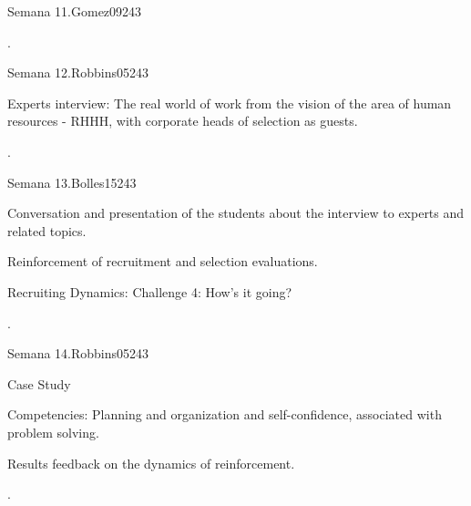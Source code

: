 \begin{syllabus}
\begin{unit}{Semana 11.}{Gomez09}{24}{3}
   \begin{unitgoals}
      \item .
   \end{unitgoals}
\end{unit}

\begin{unit}{Semana 12.}{Robbins05}{24}{3}
   \begin{topics}
      \item Experts interview: The real world of work from the vision of the area of human resources - RHHH, with corporate heads of selection as guests.
   \end{topics}

   \begin{unitgoals}
      \item .
   \end{unitgoals}
\end{unit}

\begin{unit}{Semana 13.}{Bolles15}{24}{3}
   \begin{topics}
      \item Conversation and presentation of the students about the interview to experts and related topics.
      \item Reinforcement of recruitment and selection evaluations.
      \item Recruiting Dynamics: Challenge 4: How's it going?
   \end{topics}

   \begin{unitgoals}
      \item .
   \end{unitgoals}
\end{unit}

\begin{unit}{Semana 14.}{Robbins05}{24}{3}
   \begin{topics}
      \item Case Study
      \item Competencies: Planning and organization and self-confidence, associated with problem solving.
      \item Results feedback on the dynamics of reinforcement.
   \end{topics}

   \begin{unitgoals}
      \item .
   \end{unitgoals}
\end{unit}


\end{syllabus}

